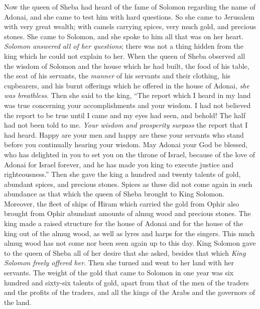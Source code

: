 \begin{biblechapter} %
 Now the queen of Sheba had heard of the fame of Solomon regarding the name of Adonai, and she came to test him with hard questions.
\verse So she came to Jerusalem with very great wealth; with camels carrying spices, very much gold, and precious stones. She came to Solomon, and she spoke to him all that was on her heart.
\verse \textit{Solomon answered all of her questions}; there was not a thing hidden from the king which he could not explain to her.
\verse When the queen of Sheba observed all the wisdom of Solomon and the house which he had built,
\verse the food of his table, the seat of his servants, the \textit{manner} of his servants and their clothing, his cupbearers, and his burnt offerings which he offered in the house of Adonai, \textit{she was breathless}.
\verse Then she said to the king, “The report which I heard in my land was true concerning your accomplishments and your wisdom.
\verse I had not believed the report to be true until I came and my eyes had seen, and behold! The half had not been told to me. \textit{Your wisdom and prosperity surpass} the report that I had heard.
\verse Happy are your men and happy are these your servants who stand before you continually hearing your wisdom.
\verse May Adonai your God be blessed, who has delighted in you to set you on the throne of Israel, because of the love of Adonai for Israel forever, and he has made you king to execute justice and righteousness.”
\verse Then she gave the king a hundred and twenty talents of gold, abundant spices, and precious stones. Spices as these did not come again in such abundance as that which the queen of Sheba brought to King Solomon.
\verse Moreover, the fleet of ships of Hiram which carried the gold from Ophir also brought from Ophir abundant amounts of almug wood and precious stones.
\verse The king made a raised structure for the house of Adonai and for the house of the king out of the almug wood, as well as lyres and harps for the singers. This much almug wood has not come nor been seen again up to this day.
\verse King Solomon gave to the queen of Sheba all of her desire that she asked, besides that which \textit{King Solomon freely offered her}. Then she turned and went to her land with her servants.
\verse The weight of the gold that came to Solomon in one year was six hundred and sixty-six talents of gold,
\verse apart from that of the men of the traders and the profits of the traders, and all the kings of the Arabs and the governors of the land.

\end{biblechapter}
